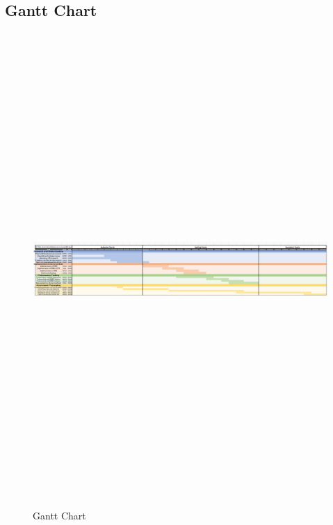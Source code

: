 \documentclass[11pt, a4paper]{article}
\begin{document}
\subsection{Gantt Chart}
\begin{figure}[H]
    \centering
    \includegraphics[width=18cm,height=18cm,keepaspectratio]{Figures/gantt.png}
    \caption{Gantt Chart}
    \label{gantt}
\end{figure}


\newpage


\newpage
\end{document}

